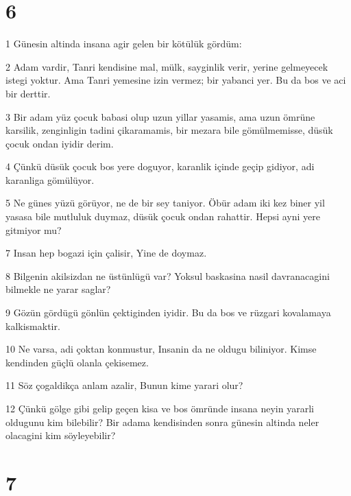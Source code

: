 \chapter{6}

\par 1 Günesin altinda insana agir gelen bir kötülük gördüm:
\par 2 Adam vardir, Tanri kendisine mal, mülk, sayginlik verir, yerine gelmeyecek istegi yoktur. Ama Tanri yemesine izin vermez; bir yabanci yer. Bu da bos ve aci bir derttir.
\par 3 Bir adam yüz çocuk babasi olup uzun yillar yasamis, ama uzun ömrüne karsilik, zenginligin tadini çikaramamis, bir mezara bile gömülmemisse, düsük çocuk ondan iyidir derim.
\par 4 Çünkü düsük çocuk bos yere doguyor, karanlik içinde geçip gidiyor, adi karanliga gömülüyor.
\par 5 Ne günes yüzü görüyor, ne de bir sey taniyor. Öbür adam iki kez biner yil yasasa bile mutluluk duymaz, düsük çocuk ondan rahattir. Hepsi ayni yere gitmiyor mu?
\par 7 Insan hep bogazi için çalisir, Yine de doymaz.
\par 8 Bilgenin akilsizdan ne üstünlügü var? Yoksul baskasina nasil davranacagini bilmekle ne yarar saglar?
\par 9 Gözün gördügü gönlün çektiginden iyidir. Bu da bos ve rüzgari kovalamaya kalkismaktir.
\par 10 Ne varsa, adi çoktan konmustur, Insanin da ne oldugu biliniyor. Kimse kendinden güçlü olanla çekisemez.
\par 11 Söz çogaldikça anlam azalir, Bunun kime yarari olur?
\par 12 Çünkü gölge gibi gelip geçen kisa ve bos ömründe insana neyin yararli oldugunu kim bilebilir? Bir adama kendisinden sonra günesin altinda neler olacagini kim söyleyebilir?

\chapter{7}

